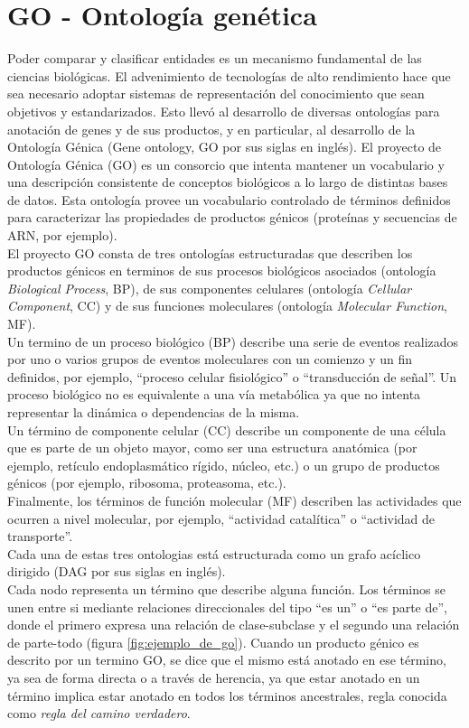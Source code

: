 \section{GO - Ontología genética}
Poder comparar y clasificar entidades es un mecanismo fundamental de las ciencias biológicas. El advenimiento de tecnologías de alto rendimiento hace que sea necesario adoptar sistemas de representación del conocimiento que sean objetivos y estandarizados. Esto llevó al desarrollo de diversas ontologías para anotación de genes y de sus productos, y en particular, al desarrollo de la Ontología Génica (Gene ontology, GO por sus siglas en inglés).
El proyecto de Ontología Génica (GO) es un consorcio que intenta mantener un vocabulario y una descripción consistente de conceptos biológicos a lo largo de distintas bases de datos. Esta ontología provee un vocabulario controlado de términos definidos para caracterizar las propiedades de productos génicos (proteínas y secuencias de ARN, por ejemplo).\\
El proyecto GO consta de tres ontologías estructuradas que describen los productos génicos en terminos de sus procesos biológicos asociados (ontología \textit{Biological Process}, BP), de sus componentes celulares (ontología \textit{Cellular Component}, CC) y de sus funciones moleculares (ontología \textit{Molecular Function}, MF).\\
Un termino de un proceso biológico (BP) describe una serie de eventos realizados por uno o varios grupos de eventos moleculares con un comienzo y un fin definidos, por ejemplo, ``proceso celular fisiológico'' o ``transducción de señal''. Un proceso biológico no es equivalente a una vía metabólica ya que no intenta representar la dinámica o dependencias de la misma.\\
Un término de componente celular (CC) describe un componente de una célula que es parte de un objeto mayor, como ser una estructura anatómica (por ejemplo, retículo endoplasmático rígido, núcleo, etc.) o un grupo de productos génicos (por ejemplo, ribosoma, proteasoma, etc.).\\
Finalmente, los términos de función molecular (MF) describen las actividades que ocurren a nivel molecular, por ejemplo, ``actividad catalítica'' o ``actividad de transporte''.\\
Cada una de estas tres ontologias está estructurada como un grafo acíclico dirigido (DAG por sus siglas en inglés).\\
Cada nodo representa un término que describe alguna función. Los términos se unen entre si mediante relaciones direccionales del tipo ``es un'' o ``es parte de'', donde el primero expresa una relación de clase-subclase y el segundo una relación de parte-todo (figura \ref{fig:ejemplo_de_go}). Cuando un producto génico es descrito por un termino GO, se dice que el mismo está anotado en ese término, ya sea de forma directa o a través de herencia, ya que estar anotado en un término implica estar anotado en todos los términos ancestrales, regla conocida como \textit{regla del camino verdadero}.\\
